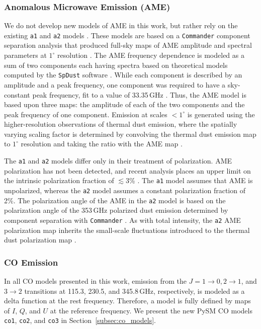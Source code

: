 \documentclass[twocolumn]{aastex631}
\begin{document}
\subsubsection{Anomalous Microwave Emission (AME)}
We do not develop new models of AME in this work, but rather rely on the existing \texttt{a1} and \texttt{a2} models \citep{Thorne:2017}. These models are based on a \texttt{Commander} component separation analysis that produced full-sky maps of AME amplitude and spectral parameters at $1^\circ$ resolution \citep{planck2014-a12}. The AME frequency dependence is modeled as a sum of two components each having spectra based on theoretical models computed by the \texttt{SpDust} software \citep{Ali-Haimoud:2009, Silsbee:2011}. While each component is described by an amplitude and a peak frequency, one component was required to have a sky-constant peak frequency, fit to a value of 33.35\,GHz \citep{planck2014-a12}. Thus, the AME model is based upon three maps: the amplitude of each of the two components and the peak frequency of one component. Emission at scales $<1^\circ$ is generated using the higher-resolution observations of thermal dust emission, where the spatially varying scaling factor is determined by convolving the thermal dust emission map to $1^\circ$ resolution and taking the ratio with the AME map \citep{Thorne:2017}.

The \texttt{a1} and \texttt{a2} models differ only in their treatment of polarization. AME polarization has not been detected, and recent analysis places an upper limit on the intrinsic polarization fraction of $\lesssim3$\% \citep{Herman:2023}. The \texttt{a1} model assumes that AME is unpolarized, whereas the \texttt{a2} model assumes a constant polarization fraction of 2\%. The polarization angle of the AME in the \texttt{a2} model is based on the polarization angle of the 353\,GHz polarized dust emission determined by component separation with \texttt{Commander} \citep{planck2014-a12}. As with total intensity, the \texttt{a2} AME polarization map inherits the small-scale fluctuations introduced to the thermal dust polarization map \citep[see][for details]{Thorne:2017}.

\subsubsection{CO Emission}
In all CO models presented in this work, emission from the $J = 1\rightarrow0, 2\rightarrow1$, and $3\rightarrow2$ transitions at 115.3, 230.5, and 345.8\,GHz, respectively, is modeled as a delta function at the rest frequency. Therefore, a model is fully defined by maps of $I$, $Q$, and $U$ at the reference frequency. We present the new PySM CO models \texttt{co1}, \texttt{co2}, and \texttt{co3} in Section~\ref{subsec:co_models}.
\end{document}

